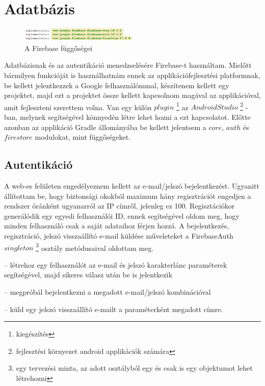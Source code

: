 \section{Adatbázis}\label{sec:ALAP:adatelem}

 \begin{figure}
	\centering
	\setlength{\abovecaptionskip}{0pt}
	\setlength{\belowcaptionskip}{0pt}
	\includegraphics[width=0.5\textwidth]{images/firebase_gradle}
	\caption{A Firebase függőségei\label{fig:ALAP:sm2}}
\end{figure}

Adatbázisnak és az autentikáció menedzselésére Firebase-t használtam. Mielőtt bármilyen funkcióját is használhatnám ennek az applikációfejlesztési platformnak, be kellett jelentkezzek a Google felhasználómmal, készítenem kellett egy projektet, majd ezt a projektet össze kellett kapcsolnom magával az applikációval, amit fejleszteni szerettem volna. Van egy külön \(plugin\)%
\footnote{ %
	kiegészítés
}  %
 az \(Android Studio\)%
 \footnote{ %
 	fejlesztési környezet android applikációk számára
 }  %
-ban, melynek segítségével könnyedén létre lehet hozni a ezt kapcsolatot. Előtte azonban az applikáció Gradle állományába be kellett jelentsem a \(core\), \(auth\) és \(firestore\) modulokat, mint függőségeket.
 

 

\subsection{Autentikáció}

A web-es felületen engedélyeznem kellett az e-mail/jelszó bejelentkezést. Ugyanitt állítottam be, hogy biztonsági okokból maximum hány regisztrációt engedjen a rendszer óránként ugyanarról az IP címről, jelenleg ez 100. Regisztációkor generálódik egy egyedi felhasználói ID, ennek segítségével oldom meg, hogy minden felhasználó csak a saját adataihoz férjen hozzá. A bejelentkezés, regisztráció, jelszó visszaállító e-mail küldése műveleteket a FirebaseAuth \(singleton\)%
\footnote{ %
	egy tervezési minta, az adott osztályból egy és csak is egy objektumot lehet létrehozni
}  %
 osztály metódusaival oldottam meg.
 
 \begin{description}
 	\setlength{\itemsep}{0.04mm}
 	\item[createUserWithEmailAndPassword(email, jelszó)] -- létrehoz egy felhasználót az e-mail és jelszó karakterlánc paraméterek segítségével, majd sikeres válasz után be is jelentkezik
 	\item[signInWithEmailAndPassword(email, jelszó)] -- megpróbál bejelentkezni a megadott e-mail/jelszó kombinációval
 	\item[sendPasswordResetEmail(email)] -- küld egy jelszó visszaállító e-mailt a paraméterként megadott címre.
 \end{description}


